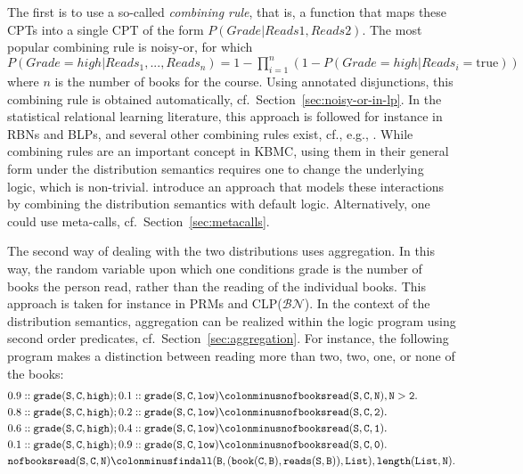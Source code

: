 \documentclass[a4paper]{article}
\newcommand{\true}{\ensuremath{\mathrm{true}}}
\newcommand{\clpbn}
  {CLP($\mathcal{BN}$)}
\begin{document}
The first is to use a so-called \emph{combining rule}, that is, a function that maps these CPTs into a single 
CPT of the form $P(Grade | Reads1, Reads2)$. The most popular combining rule
is noisy-or, for which $P(Grade = high | Reads_1, ...,Reads_n) = 1-\prod_{i=1}^n(1-P(Grade=high |Reads_i=\true))$ where $n$ is the number of books for the course.  
Using annotated disjunctions, this combining rule is obtained
automatically, cf.~Section~\ref{sec:noisy-or-in-lp}. 
In the statistical relational learning literature, this approach is
followed for instance in RBNs and BLPs, and several other combining
rules exist, cf., e.g.,
\citep{Jaeger97,Kersting08,natarajan:icml05}.
While combining rules are an important concept in KBMC, using them in
their general form under the distribution semantics requires one to change the underlying logic,
which is non-trivial. \cite{Hommersom11} introduce an approach that
models these interactions by combining the distribution semantics with
default logic. Alternatively, one could use meta-calls, cf.~Section~\ref{sec:metacalls}.


The second way of dealing with the two distributions uses aggregation. In this way, 
the random variable upon which one conditions grade is the number of books the person read,
rather than the reading of the individual books. This approach is 
taken for instance  in PRMs and \clpbn. In the context of the distribution
semantics, aggregation can be realized within the logic program using second order
predicates, cf.~Section~\ref{sec:aggregation}. For instance, the
following program makes a distinction between reading more than two,
two, one, or none of the books:
\begin{align*}
&0.9::\mathtt{grade(S,C,high)} ; 0.1::\mathtt{grade(S,C,low)} \colonminus \mathtt{nofbooksread(S,C,N), N>2 . }\\
&0.8::\mathtt{grade(S,C,high)} ; 0.2::\mathtt{grade(S,C,low)} \colonminus \mathtt{nofbooksread(S,C,2).}\\
&0.6::\mathtt{grade(S,C,high)} ; 0.4::\mathtt{grade(S,C,low)}  \colonminus \mathtt{nofbooksread(S,C,1).}\\
&0.1::\mathtt{grade(S,C,high)} ; 0.9::\mathtt{grade(S,C,low)} \colonminus \mathtt{nofbooksread(S,C,0).}\\
&\mathtt{nofbooksread}\mathtt{(S,C,N)}\colonminus
\mathtt{findall(B,(book(C,B),reads(S,B)),List),length(List,N).}\\
\end{align*}
\end{document}
